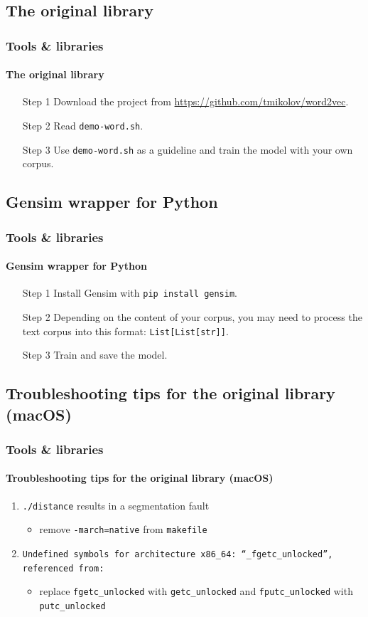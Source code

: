 \documentclass{beamer}
\begin{document}
\subsection{The original library}
\begin{frame}
    \frametitle{Tools \& libraries}
    \framesubtitle{The original library}
    \begin{enumerate}
        \item[Step 1] Download the project from \href{https://github.com/tmikolov/word2vec}{https://github.com/tmikolov/word2vec}.
        \item[Step 2] Read \texttt{demo-word.sh}.
        \item[Step 3] Use \texttt{demo-word.sh} as a guideline and train the model with your own corpus. 
    \end{enumerate}
\end{frame}

\subsection{Gensim wrapper for Python}
\begin{frame}
    \frametitle{Tools \& libraries}
    \framesubtitle{Gensim wrapper for Python}
    \begin{enumerate}
        \item[Step 1] Install Gensim with \texttt{pip install gensim}.
        \item[Step 2] Depending on the content of your corpus, you may need to process the text corpus into this format: \texttt{List[List[str]]}.
        \item[Step 3]  Train and save the model. 
    \end{enumerate}
\end{frame}

\subsection{Troubleshooting tips for the original library (macOS)}
\begin{frame}
    \frametitle{Tools \& libraries}
    \framesubtitle{Troubleshooting tips for the original library (macOS)}   
    \begin{enumerate} 
        \item \texttt{./distance} results in a segmentation fault
            \begin{itemize}
                \item remove \texttt{-march=native} from \texttt{makefile}
            \end{itemize}
        \item \texttt{Undefined symbols for architecture x86\_64: ``\_fgetc\_unlocked'', referenced from:}
            \begin{itemize}
                \item replace \texttt{fgetc\_unlocked} with \texttt{getc\_unlocked} and \texttt{fputc\_unlocked} with \texttt{putc\_unlocked}
            \end{itemize}
    \end{enumerate}
\end{frame}
\end{document}
